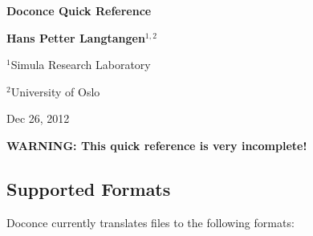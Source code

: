 \documentclass[%
oneside,                 %
final,                   %
10pt]{article}
\begin{document}





\begin{center}
{\LARGE\bf Doconce Quick Reference}
\end{center}





\begin{center}
{\bf Hans Petter Langtangen${}^{1, 2}$} \\ [0mm]
\end{center}

\begin{center}
\centerline{{\small ${}^1$Simula Research Laboratory}}
\centerline{{\small ${}^2$University of Oslo}}
\end{center}





\begin{center}
Dec 26, 2012
\end{center}

\vspace{1cm}



\tableofcontents

\vspace{1cm} %






\textbf{WARNING: This quick reference is very incomplete!}

\subsection{Supported Formats}

Doconce currently translates files to the following formats:
\end{document}
